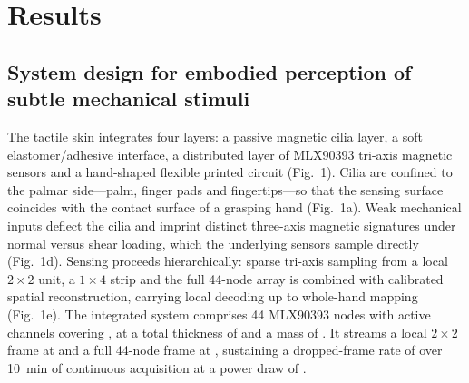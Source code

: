 \section*{Results}

\subsection*{System design for embodied perception of subtle mechanical stimuli}
The tactile skin integrates four layers: a passive magnetic cilia layer, a
soft elastomer/adhesive interface, a distributed layer of MLX90393 tri-axis
magnetic sensors and a hand-shaped flexible printed circuit (Fig.~1). Cilia
are confined to the palmar side---palm, finger pads and fingertips---so that
the sensing surface coincides with the contact surface of a grasping hand
(Fig.~1a). Weak mechanical inputs deflect the cilia and imprint distinct
three-axis magnetic signatures under normal versus shear loading, which the
underlying sensors sample directly (Fig.~1d). Sensing proceeds
hierarchically: sparse tri-axis sampling from a local $2\times2$ unit, a
$1\times4$ strip and the full 44-node array is combined with calibrated
spatial reconstruction, carrying local decoding up to whole-hand mapping
(Fig.~1e). The integrated system comprises 44 MLX90393 nodes with
 active channels covering
, at a total thickness of
 and a mass of .
It streams a local $2\times2$ frame at  and a
full 44-node frame at , sustaining a
dropped-frame rate of  over 10~min
of continuous acquisition at a power draw of .

